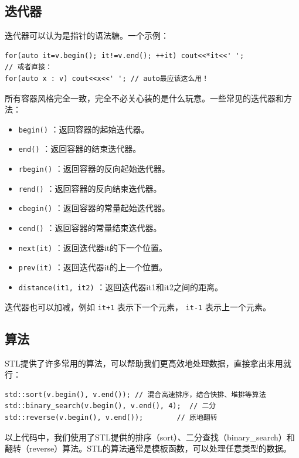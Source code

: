 \subsection{迭代器}

迭代器可以认为是指针的语法糖。一个示例：
\begin{verbatim}
for(auto it=v.begin(); it!=v.end(); ++it) cout<<*it<<' ';
// 或者直接：
for(auto x : v) cout<<x<<' '; // auto最应该这么用！
\end{verbatim}

所有容器风格完全一致，完全不必关心装的是什么玩意。一些常见的迭代器和方法：
\begin{itemize}
  \item  \texttt{begin()} ：返回容器的起始迭代器。
  \item  \texttt{end()} ：返回容器的结束迭代器。
  \item  \texttt{rbegin()} ：返回容器的反向起始迭代器。
  \item  \texttt{rend()} ：返回容器的反向结束迭代器。
  \item  \texttt{cbegin()} ：返回容器的常量起始迭代器。
  \item  \texttt{cend()} ：返回容器的常量结束迭代器。
  \item  \texttt{next(it)} ：返回迭代器it的下一个位置。
  \item  \texttt{prev(it)} ：返回迭代器it的上一个位置。
  \item  \texttt{distance(it1, it2)} ：返回迭代器it1和it2之间的距离。
\end{itemize}

迭代器也可以加减，例如 \texttt{it+1} 表示下一个元素， \texttt{it-1} 表示上一个元素。

\subsection{算法}
STL提供了许多常用的算法，可以帮助我们更高效地处理数据，直接拿出来用就行：
\begin{verbatim}
std::sort(v.begin(), v.end()); // 混合高速排序，结合快排、堆排等算法
std::binary_search(v.begin(), v.end(), 4);  // 二分
std::reverse(v.begin(), v.end());        // 原地翻转
\end{verbatim}

以上代码中，我们使用了STL提供的排序（sort）、二分查找（binary\_search）和翻转（reverse）算法。STL的算法通常是模板函数，可以处理任意类型的数据。

